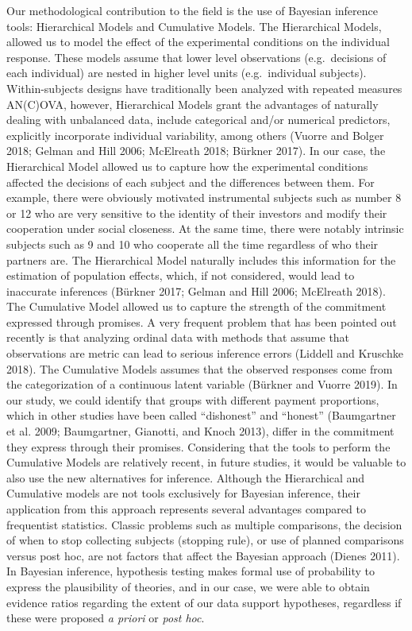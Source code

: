 \documentclass[smallextended]{svjour3}       %
\begin{document}
Our methodological contribution to the field is the use of Bayesian
inference tools: Hierarchical Models and Cumulative Models. The
Hierarchical Models, allowed us to model the effect of the experimental
conditions on the individual response. These models assume that lower
level observations (e.g.~decisions of each individual) are nested in
higher level units (e.g.~individual subjects). Within-subjects designs
have traditionally been analyzed with repeated measures AN(C)OVA,
however, Hierarchical Models grant the advantages of naturally dealing
with unbalanced data, include categorical and/or numerical predictors,
explicitly incorporate individual variability, among others (Vuorre and
Bolger 2018; Gelman and Hill 2006; McElreath 2018; Bürkner 2017). In our
case, the Hierarchical Model allowed us to capture how the experimental
conditions affected the decisions of each subject and the differences
between them. For example, there were obviously motivated instrumental
subjects such as number 8 or 12 who are very sensitive to the identity
of their investors and modify their cooperation under social closeness.
At the same time, there were notably intrinsic subjects such as 9 and 10
who cooperate all the time regardless of who their partners are. The
Hierarchical Model naturally includes this information for the
estimation of population effects, which, if not considered, would lead
to inaccurate inferences (Bürkner 2017; Gelman and Hill 2006; McElreath
2018). The Cumulative Model allowed us to capture the strength of the
commitment expressed through promises. A very frequent problem that has
been pointed out recently is that analyzing ordinal data with methods
that assume that observations are metric can lead to serious inference
errors (Liddell and Kruschke 2018). The Cumulative Models assumes that
the observed responses come from the categorization of a continuous
latent variable (Bürkner and Vuorre 2019). In our study, we could
identify that groups with different payment proportions, which in other
studies have been called ``dishonest'' and ``honest'' (Baumgartner et
al. 2009; Baumgartner, Gianotti, and Knoch 2013), differ in the
commitment they express through their promises. Considering that the
tools to perform the Cumulative Models are relatively recent, in future
studies, it would be valuable to also use the new alternatives for
inference. Although the Hierarchical and Cumulative models are not tools
exclusively for Bayesian inference, their application from this approach
represents several advantages compared to frequentist statistics.
Classic problems such as multiple comparisons, the decision of when to
stop collecting subjects (stopping rule), or use of planned comparisons
versus post hoc, are not factors that affect the Bayesian approach
(Dienes 2011). In Bayesian inference, hypothesis testing makes formal
use of probability to express the plausibility of theories, and in our
case, we were able to obtain evidence ratios regarding the extent of our
data support hypotheses, regardless if these were proposed \emph{a
priori} or \emph{post hoc}.
\end{document}
